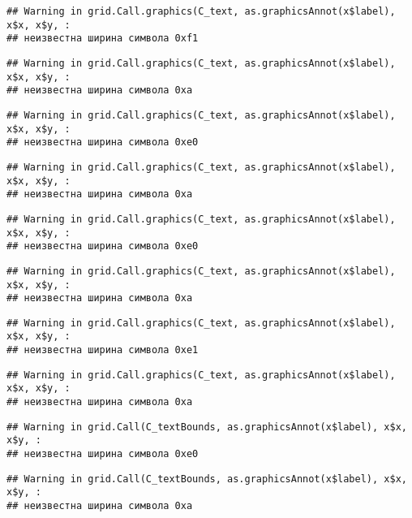 \documentclass[
]{article}
\begin{document}
\begin{verbatim}
## Warning in grid.Call.graphics(C_text, as.graphicsAnnot(x$label), x$x, x$y, :
## неизвестна ширина символа 0xf1
\end{verbatim}

\begin{verbatim}
## Warning in grid.Call.graphics(C_text, as.graphicsAnnot(x$label), x$x, x$y, :
## неизвестна ширина символа 0xa
\end{verbatim}

\begin{verbatim}
## Warning in grid.Call.graphics(C_text, as.graphicsAnnot(x$label), x$x, x$y, :
## неизвестна ширина символа 0xe0
\end{verbatim}

\begin{verbatim}
## Warning in grid.Call.graphics(C_text, as.graphicsAnnot(x$label), x$x, x$y, :
## неизвестна ширина символа 0xa
\end{verbatim}

\begin{verbatim}
## Warning in grid.Call.graphics(C_text, as.graphicsAnnot(x$label), x$x, x$y, :
## неизвестна ширина символа 0xe0
\end{verbatim}

\begin{verbatim}
## Warning in grid.Call.graphics(C_text, as.graphicsAnnot(x$label), x$x, x$y, :
## неизвестна ширина символа 0xa
\end{verbatim}

\begin{verbatim}
## Warning in grid.Call.graphics(C_text, as.graphicsAnnot(x$label), x$x, x$y, :
## неизвестна ширина символа 0xe1
\end{verbatim}

\begin{verbatim}
## Warning in grid.Call.graphics(C_text, as.graphicsAnnot(x$label), x$x, x$y, :
## неизвестна ширина символа 0xa
\end{verbatim}

\begin{verbatim}
## Warning in grid.Call(C_textBounds, as.graphicsAnnot(x$label), x$x, x$y, :
## неизвестна ширина символа 0xe0
\end{verbatim}

\begin{verbatim}
## Warning in grid.Call(C_textBounds, as.graphicsAnnot(x$label), x$x, x$y, :
## неизвестна ширина символа 0xa
\end{verbatim}
\end{document}
